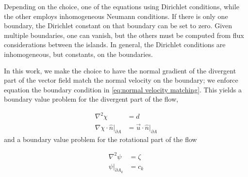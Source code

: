 \documentclass[draft]{agujournal2019}
\begin{document}
Depending on the choice, one of the equations using Dirichlet conditions, while the other employs inhomogeneous Neumann conditions. If there is only one boundary, the Dirichlet constant on that boundary can be set to zero. Given multiple boundaries, one can vanish, but the others must be computed from flux considerations between the islands. In general, the Dirichlet conditions are inhomogeneous, but constants, on the boundaries.

In this work, we make the choice to have the normal gradient of the divergent part of the vector field match the normal velocity on the boundary; we enforce equation the boundary condition in \eqref{eq:normal velocity matching}. This yields a boundary value problem for the divergent part of the flow,

\begin{subequations}
    \begin{align}
        \nabla^2 \chi &= d \\
        \nabla \chi \cdot \hat{n}|_{\partial A} &= \vec{u} \cdot \hat{n}|_{\partial A}
    \end{align} \label{eq:divergent-part-bvp}
\end{subequations}
and a boundary value problem for the rotational part of the flow

\begin{subequations}
    \begin{align}
        \nabla^2 \psi &= \zeta \\
        \psi|_{\partial A_k} &= c_k
    \end{align} \label{eq:rotational-part-bvp}
\end{subequations}
\end{document}
